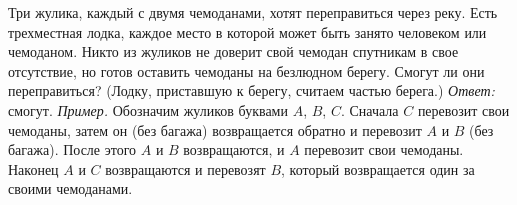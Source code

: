 \problem{}
Три жулика, каждый с двумя чемоданами, хотят переправиться через реку.
Есть трехместная лодка, каждое место в которой может быть занято человеком или
чемоданом.
Никто из жуликов не доверит свой чемодан спутникам в свое отсутствие, но готов
оставить чемоданы на безлюдном берегу.
Смогут ли они переправиться?
(Лодку, приставшую к берегу, считаем частью берега.)
\solution
\emph{Ответ:} смогут.
\emph{Пример.}
Обозначим жуликов буквами $A$, $B$, $C$.
Сначала $C$ перевозит свои чемоданы, затем он (без багажа) возвращается обратно
и перевозит $A$ и $B$ (без багажа).
После этого $A$ и $B$ возвращаются, и $A$ перевозит свои чемоданы.
Наконец $A$ и $C$ возвращаются и перевозят $B$, который возвращается один за
своими чемоданами.
\endproblem
